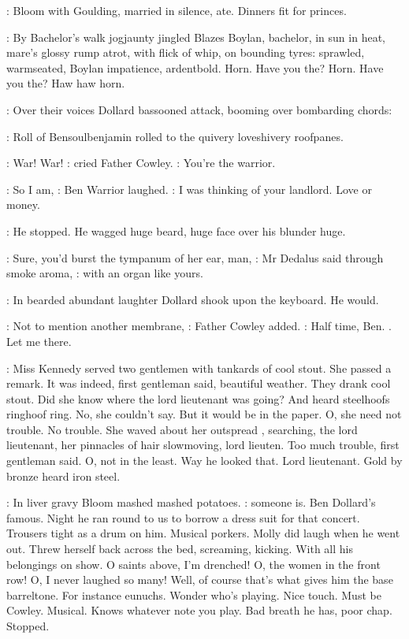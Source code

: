 :
Bloom with Goulding,
married in silence,
ate.
Dinners fit for princes.

:
By Bachelor's walk jogjaunty jingled Blazes Boylan,
bachelor,
in sun
in heat,
mare's glossy rump atrot,
with flick of whip,
on bounding tyres:
sprawled,
warmseated,
Boylan impatience,
ardentbold.
Horn.
Have you
the?
Horn.
Have you the?
Haw haw horn.

:
Over their voices Dollard bassooned attack,
booming over bombarding
chords:


:
Roll of Bensoulbenjamin rolled to the
quivery loveshivery roofpanes.

\cowley:
War!
War!
:
cried Father Cowley.
\cowley:
You're the warrior.

\dollard:
So I am,
:
Ben Warrior laughed.
\dollard:
I was thinking of your landlord.
Love or money.

:
He stopped.
He wagged huge beard,
huge face over his blunder huge.

\simon:
Sure,
you'd burst the tympanum of her ear,
man,
:
Mr Dedalus said through smoke aroma,
\simon:
with an organ like yours.

:
In bearded abundant laughter Dollard shook upon the keyboard.
He would.

\cowley:
Not to mention another membrane,
:
Father Cowley added.
\cowley:
Half time,
Ben.
.
Let me there.

:
Miss Kennedy served two gentlemen with tankards of cool stout.
She
passed a remark.
It was indeed,
first gentleman said,
beautiful weather.
They drank cool stout.
Did she know where the lord lieutenant was going?
And heard steelhoofs ringhoof ring.
No,
she couldn't say.
But it would be
in the paper.
O,
she need not trouble.
No trouble.
She waved about her
outspread ,
searching,
the lord lieutenant,
her pinnacles of
hair slowmoving,
lord lieuten.
Too much trouble,
first gentleman said.
O,
not in the least.
Way he looked that.
Lord lieutenant.
Gold by bronze
heard iron steel.%


:
In liver gravy Bloom mashed mashed potatoes.
\BloomInt:
someone is.
Ben Dollard's famous.
Night he ran round to us to borrow a
dress suit for that concert.
Trousers tight as a drum on him.
Musical
porkers.
Molly did laugh when he went out.
Threw herself back across the
bed,
screaming,
kicking.
With all his belongings on show.
O saints above,
I'm drenched!
O,
the women in the front row!
O,
I never laughed so many!
Well,
of course that's what gives him the base barreltone.
For instance
eunuchs.
Wonder who's playing.
Nice touch.
Must be Cowley.
Musical.
Knows whatever note you play.
Bad breath he has,
poor chap.
Stopped.

